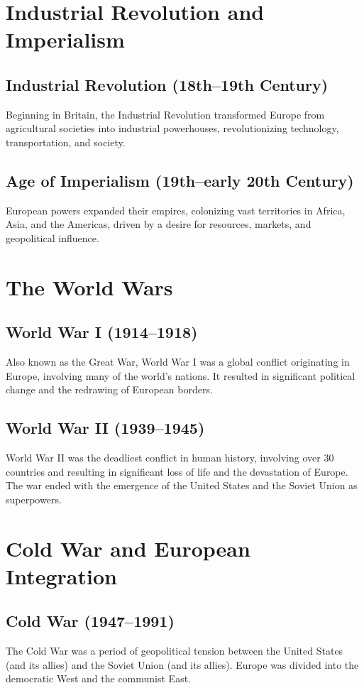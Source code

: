 \documentclass{book}
\begin{document}
\section{Industrial Revolution and Imperialism}
\label{sec:industrial-revolution-imperialism}
\subsection{Industrial Revolution (18th–19th Century)}
Beginning in Britain, the Industrial Revolution transformed Europe from agricultural societies into industrial powerhouses, revolutionizing technology, transportation, and society.

\subsection{Age of Imperialism (19th–early 20th Century)}
European powers expanded their empires, colonizing vast territories in Africa, Asia, and the Americas, driven by a desire for resources, markets, and geopolitical influence.

\section{The World Wars}
\label{sec:world-wars}
\subsection{World War I (1914–1918)}
Also known as the Great War, World War I was a global conflict originating in Europe, involving many of the world’s nations. It resulted in significant political change and the redrawing of European borders.

\subsection{World War II (1939–1945)}
World War II was the deadliest conflict in human history, involving over 30 countries and resulting in significant loss of life and the devastation of Europe. The war ended with the emergence of the United States and the Soviet Union as superpowers.

\section{Cold War and European Integration}
\label{sec:cold-war-european-integration}
\subsection{Cold War (1947–1991)}
The Cold War was a period of geopolitical tension between the United States (and its allies) and the Soviet Union (and its allies). Europe was divided into the democratic West and the communist East.
\end{document}
